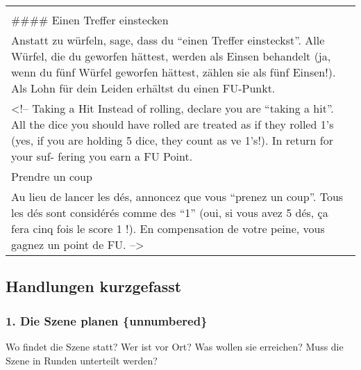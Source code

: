 \documentclass[]{article}
\begin{document}
\begin{longtable}[]{@{}l@{}}
\begin{minipage}[t]{0.05\columnwidth}
\strut\end{minipage}\tabularnewline
\begin{minipage}[t]{0.05\columnwidth}\raggedright\strut
\#\#\#\# Einen Treffer einstecken
\strut\end{minipage}\tabularnewline
\begin{minipage}[t]{0.05\columnwidth}\raggedright\strut
Anstatt zu würfeln, sage, dass du ``einen Treffer einsteckst''. Alle
Würfel, die du geworfen hättest, werden als Einsen behandelt (ja, wenn
du fünf Würfel geworfen hättest, zählen sie als fünf Einsen!). Als Lohn
für dein Leiden erhältst du einen FU-Punkt.
\strut\end{minipage}\tabularnewline
\begin{minipage}[t]{0.05\columnwidth}\raggedright\strut
\textless{}!-- Taking a Hit Instead of rolling, declare you are ``taking
a hit''. All the dice you should have rolled are treated as if they
rolled 1's (yes, if you are holding 5 dice, they count as ve 1's!). In
return for your suf- fering you earn a FU Point.
\strut\end{minipage}\tabularnewline
\begin{minipage}[t]{0.05\columnwidth}\raggedright\strut
Prendre un coup
\strut\end{minipage}\tabularnewline
\begin{minipage}[t]{0.05\columnwidth}\raggedright\strut
Au lieu de lancer les dés, annoncez que vous ``prenez un coup''. Tous
les dés sont considérés comme des ``1'' (oui, si vous avez 5 dés, ça
fera cinq fois le score 1 !). En compensation de votre peine, vous
gagnez un point de FU. --\textgreater{}
\strut\end{minipage}\tabularnewline
\bottomrule
\end{longtable}

\newpage

\subsection{Handlungen kurzgefasst}\label{handlungen-kurzgefasst}

\subsubsection{1. Die Szene planen
\{unnumbered\}}\label{die-szene-planen-unnumbered}

Wo findet die Szene statt? Wer ist vor Ort? Was wollen sie erreichen?
Muss die Szene in Runden unterteilt werden?
\end{document}
